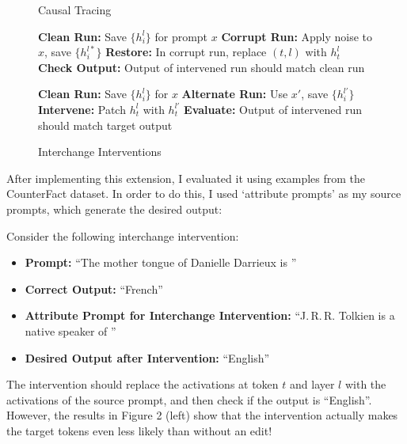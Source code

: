 \documentclass{article}
\begin{document}
\begin{figure}[H]
  \centering
  \begin{minipage}{0.48\textwidth}
      \begin{algorithm}[H]
          \caption{Causal Tracing}
          \begin{algorithmic}[1]
          \State \textbf{Clean Run:} Save \( \{h_i^l\} \) for prompt \( x \)
          \State \textbf{Corrupt Run:} Apply noise to \( x \), save \( \{h_i^{l*}\} \)
          \State \textbf{Restore:} In corrupt run, replace \( (t, l) \) with \( h_t^l \)
          \State \textbf{Check Output:} Output of intervened run should match clean run
          \end{algorithmic}
          \label{alg:causal_tracing}
      \end{algorithm}
  \end{minipage}\hfill
  \begin{minipage}{0.48\textwidth}
      \begin{algorithm}[H]
          \caption{Interchange Interventions}
          \begin{algorithmic}[1]
          \State \textbf{Clean Run:} Save \( \{h_i^l\} \) for \( x \)
          \State \textbf{Alternate Run:} Use \( x' \), save \( \{h_i^{l'}\} \)
          \State \textbf{Intervene:} Patch \( h_t^l \) with \( h_t^{l'} \)
          \State \textbf{Evaluate:} Output of intervened run should match target output
          \end{algorithmic}
          \label{alg:interchange_interventions}
      \end{algorithm}
  \end{minipage}
\end{figure}


After implementing this extension, I evaluated it using examples from the CounterFact dataset. In order to do this, I used `attribute prompts' as my source prompts, which generate the desired output:
  
\begin{example}\label{ex:Danielle}
  Consider the following interchange intervention:
  \begin{itemize}
      \item \textbf{Prompt:} ``The mother tongue of Danielle Darrieux is ''
      \item \textbf{Correct Output:} ``French''
      \item \textbf{Attribute Prompt for Interchange Intervention:} ``J.\,R.\,R. Tolkien is a native speaker of ''
      \item \textbf{Desired Output after Intervention:} ``English''
  \end{itemize}
  The intervention should replace the activations at token $t$ and layer $l$ with the activations of the source prompt, and then check if the output is ``English''. However, the results in Figure 2 (left) show that the intervention actually makes the target tokens even less likely than without an edit!
  \end{example}
\end{document}
